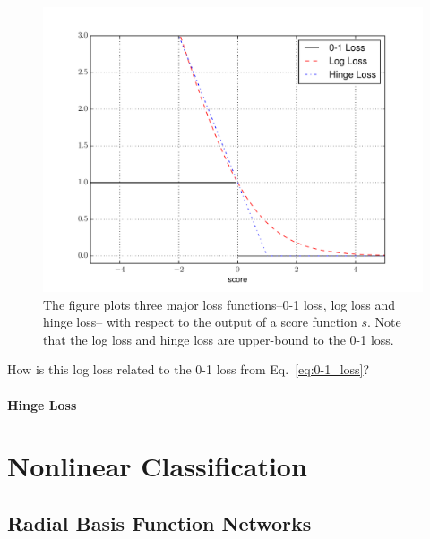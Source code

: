 \documentclass{report}
\newcommand{\todo}[1]{{\Large\textcolor{red}{#1}}}
\begin{document}
\begin{figure}[t]
    \centering
    \begin{minipage}{0.6\textwidth}
        \raggedright
        \includegraphics[width=0.9\columnwidth,clip=True,trim=50 0 50 0]{figures/loss.pdf}
    \end{minipage}
    \begin{minipage}{0.39\textwidth}
        \raggedleft
        \caption{
            \label{fig:loss}
            The figure plots three major loss functions--0-1 loss, log loss and
            hinge loss-- with respect to the output of a score function $s$.
            Note that the log loss and hinge loss are upper-bound to the 0-1
            loss.
        }
    \end{minipage}
\end{figure}

How is this log loss related to the 0-1 loss from Eq.~\eqref{eq:0-1_loss}?  

\todo{}


\paragraph{Hinge Loss}

\todo{}


\section{Nonlinear Classification}

\subsection{Radial Basis Function Networks}
\end{document}
